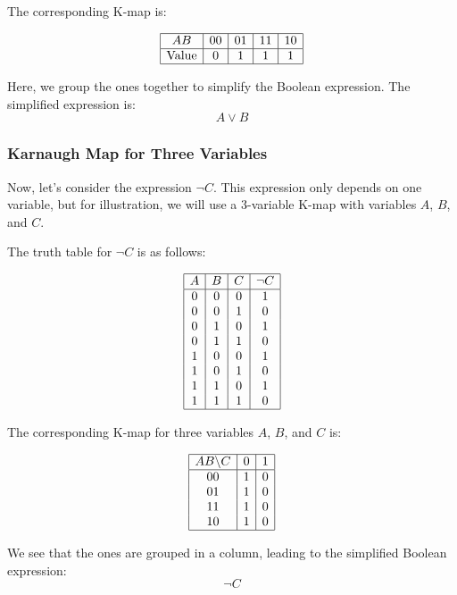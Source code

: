 The corresponding K-map is:

\[
	\begin{array}{|c|c|c|c|c|}
		\hline
		AB           & 00 & 01 & 11 & 10 \\
		\hline
		\text{Value} & 0  & 1  & 1  & 1  \\
		\hline
	\end{array}
\]

Here, we group the ones together to simplify the Boolean expression. The simplified expression is:
\[
	A \lor B
\]

\subsubsection{Karnaugh Map for Three Variables}

Now, let's consider the expression \( \neg C \). This expression only depends on one variable, but for illustration, we will use a 3-variable K-map with variables \( A \), \( B \), and \( C \).

The truth table for \( \neg C \) is as follows:

\[
	\begin{array}{|c|c|c|c|}
		\hline
		A & B & C & \neg C \\
		\hline
		0 & 0 & 0 & 1      \\
		0 & 0 & 1 & 0      \\
		0 & 1 & 0 & 1      \\
		0 & 1 & 1 & 0      \\
		1 & 0 & 0 & 1      \\
		1 & 0 & 1 & 0      \\
		1 & 1 & 0 & 1      \\
		1 & 1 & 1 & 0      \\
		\hline
	\end{array}
\]

The corresponding K-map for three variables \( A \), \( B \), and \( C \) is:

\[
	\begin{array}{|c|c|c|c|}
		\hline
		AB \backslash C & 0 & 1 \\
		\hline
		00              & 1 & 0 \\
		01              & 1 & 0 \\
		11              & 1 & 0 \\
		10              & 1 & 0 \\
		\hline
	\end{array}
\]

We see that the ones are grouped in a column, leading to the simplified Boolean expression:
\[
	\neg C
\]

